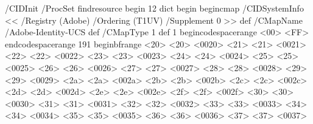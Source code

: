 

\startpdffontresource[il2] 
/CIDInit /ProcSet findresource begin
12 dict begin
  begincmap
    /CIDSystemInfo
      << /Registry (Adobe) 
         /Ordering (T1UV)  
         /Supplement 0 
      >> def
    /CMapName /Adobe-Identity-UCS def
    /CMapType 1 def
    1 begincodespacerange
      <00> <FF>
    endcodespacerange
    191 beginbfrange
      <20> <20> <0020> %
      <21> <21> <0021> %
      <22> <22> <0022> %
      <23> <23> <0023> %
      <24> <24> <0024> %
      <25> <25> <0025> %
      <26> <26> <0026> %
      <27> <27> <0027> %
      <28> <28> <0028> %
      <29> <29> <0029> %
      <2a> <2a> <002a> %
      <2b> <2b> <002b> %
      <2c> <2c> <002c> %
      <2d> <2d> <002d> %
      <2e> <2e> <002e> %
      <2f> <2f> <002f> %
      <30> <30> <0030> %
      <31> <31> <0031> %
      <32> <32> <0032> %
      <33> <33> <0033> %
      <34> <34> <0034> %
      <35> <35> <0035> %
      <36> <36> <0036> %
      <37> <37> <0037> %
